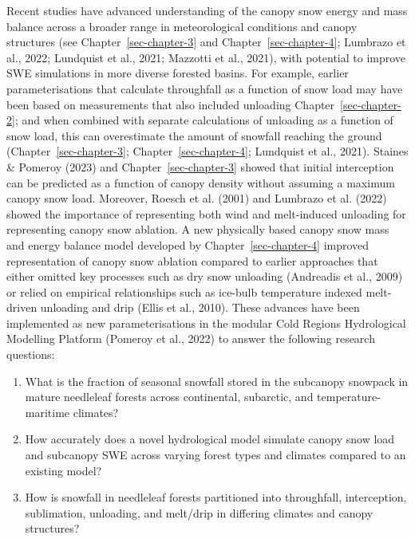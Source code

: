 \documentclass[
  letterpaper,
]{tex/uofsthesis-cs}
\providecommand{\tightlist}{%
  \setlength{\itemsep}{0pt}\setlength{\parskip}{0pt}}
\begin{document}
Recent studies have advanced understanding of the canopy snow energy and
mass balance across a broader range in meteorological conditions and
canopy structures (see Chapter~\ref{sec-chapter-3} and
Chapter~\ref{sec-chapter-4}; Lumbrazo et al., 2022; Lundquist et al.,
2021; Mazzotti et al., 2021), with potential to improve SWE simulations
in more diverse forested basins. For example, earlier parameterisations
that calculate throughfall as a function of snow load may have been
based on measurements that also included unloading
Chapter~\ref{sec-chapter-2}; and when combined with separate
calculations of unloading as a function of snow load, this can
overestimate the amount of snowfall reaching the ground
(Chapter~\ref{sec-chapter-3}; Chapter~\ref{sec-chapter-4}; Lundquist et
al., 2021). Staines \& Pomeroy (2023) and Chapter~\ref{sec-chapter-3}
showed that initial interception can be predicted as a function of
canopy density without assuming a maximum canopy snow load. Moreover,
Roesch et al. (2001) and Lumbrazo et al. (2022) showed the importance of
representing both wind and melt-induced unloading for representing
canopy snow ablation. A new physically based canopy snow mass and energy
balance model developed by Chapter~\ref{sec-chapter-4} improved
representation of canopy snow ablation compared to earlier approaches
that either omitted key processes such as dry snow unloading (Andreadis
et al., 2009) or relied on empirical relationships such as ice-bulb
temperature indexed melt-driven unloading and drip (Ellis et al., 2010).
These advances have been implemented as new parameterisations in the
modular Cold Regions Hydrological Modelling Platform (Pomeroy et al.,
2022) to answer the following research questions:

\begin{enumerate}
\def\labelenumi{\arabic{enumi}.}
\tightlist
\item
  What is the fraction of seasonal snowfall stored in the subcanopy
  snowpack in mature needleleaf forests across continental, subarctic,
  and temperature-maritime climates?
\item
  How accurately does a novel hydrological model simulate canopy snow
  load and subcanopy SWE across varying forest types and climates
  compared to an existing model?
\item
  How is snowfall in needleleaf forests partitioned into throughfall,
  interception, sublimation, unloading, and melt/drip in differing
  climates and canopy structures?
\end{enumerate}
\end{document}
